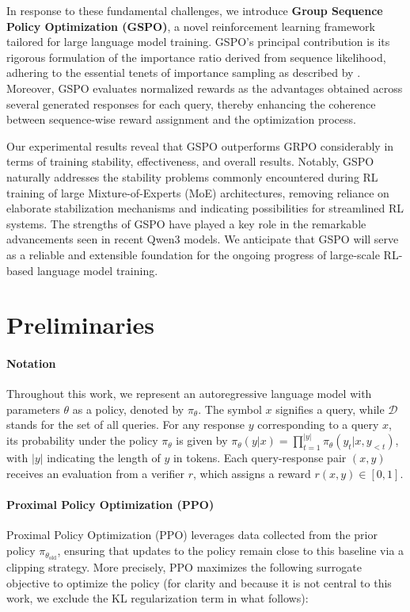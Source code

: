 In response to these fundamental challenges, we introduce \textbf{Group Sequence Policy Optimization (GSPO)}, a novel reinforcement learning framework tailored for large language model training. GSPO’s principal contribution is its rigorous formulation of the importance ratio derived from sequence likelihood, adhering to the essential tenets of importance sampling as described by \citep{click}. Moreover, GSPO evaluates normalized rewards as the advantages obtained across several generated responses for each query, thereby enhancing the coherence between sequence-wise reward assignment and the optimization process.

Our experimental results reveal that GSPO outperforms GRPO considerably in terms of training stability, effectiveness, and overall results. Notably, GSPO naturally addresses the stability problems commonly encountered during RL training of large Mixture-of-Experts (MoE) architectures, removing reliance on elaborate stabilization mechanisms and indicating possibilities for streamlined RL systems. The strengths of GSPO have played a key role in the remarkable advancements seen in recent Qwen3 models. We anticipate that GSPO will serve as a reliable and extensible foundation for the ongoing progress of large-scale RL-based language model training.

\section{Preliminaries}

\paragraph{Notation}
Throughout this work, we represent an autoregressive language model with parameters $\theta$ as a policy, denoted by $\pi_\theta$.
The symbol $x$ signifies a query, while $\mathcal{D}$ stands for the set of all queries. For any response $y$ corresponding to a query $x$, its probability under the policy $\pi_\theta$ is given by $\pi_\theta (y | x)=\prod_{t=1}^{|y|} \pi_\theta (y_t | x, y_{<t} )$, with $|y|$ indicating the length of $y$ in tokens. Each query-response pair $(x, y)$ receives an evaluation from a verifier $r$, which assigns a reward $r(x, y) \in [0, 1]$.

\paragraph{Proximal Policy Optimization (PPO)} Proximal Policy Optimization (PPO) \citep{ppo} leverages data collected from the prior policy $\pi_{\theta_\text{old}}$, ensuring that updates to the policy remain close to this baseline via a clipping strategy. More precisely, PPO maximizes the following surrogate objective to optimize the policy (for clarity and because it is not central to this work, we exclude the KL regularization term in what follows):


